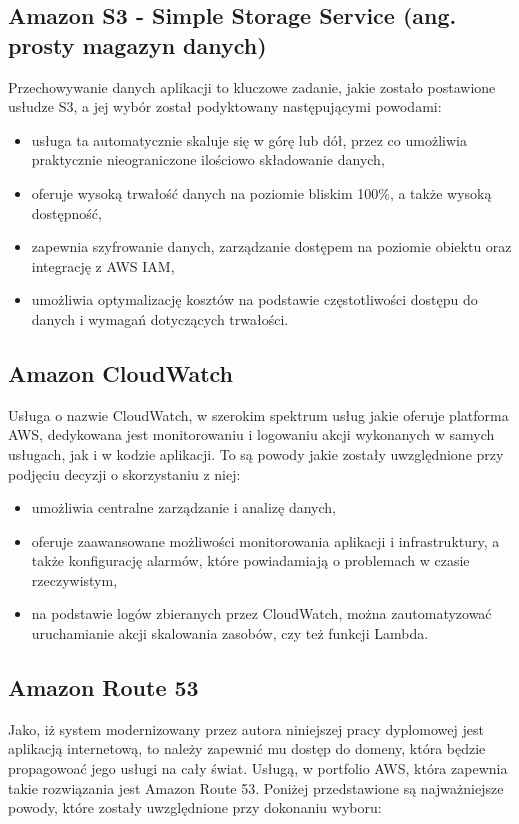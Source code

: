 \documentclass[12pt,oneside]{book}
\begin{document}
    \subsection{Amazon S3 - Simple Storage Service (ang. prosty magazyn danych)}
    Przechowywanie danych aplikacji to kluczowe zadanie, jakie zostało postawione usłudze S3, a jej wybór został podyktowany następującymi powodami:

    \begin{itemize}
        \item usługa ta automatycznie skaluje się w górę lub dół, przez co umożliwia praktycznie nieograniczone ilościowo składowanie danych,
        \item oferuje wysoką trwałość danych na poziomie bliskim 100\%, a także wysoką dostępność,
        \item zapewnia szyfrowanie danych, zarządzanie dostępem na poziomie obiektu oraz integrację z AWS IAM,
        \item umożliwia optymalizację kosztów na podstawie częstotliwości dostępu do danych i wymagań dotyczących trwałości. \cite{aws.s3}
    \end{itemize}

    \subsection{Amazon CloudWatch}
    Usługa o nazwie CloudWatch, w szerokim spektrum usług jakie oferuje platforma AWS, dedykowana jest monitorowaniu i logowaniu akcji wykonanych w samych usługach, jak i w kodzie aplikacji. To są powody jakie zostały uwzględnione przy podjęciu decyzji o skorzystaniu z niej:

    \begin{itemize}
        \item umożliwia centralne zarządzanie i analizę danych,
        \item oferuje zaawansowane możliwości monitorowania aplikacji i infrastruktury, a także konfigurację alarmów, które powiadamiają o problemach w czasie rzeczywistym,
        \item na podstawie logów zbieranych przez CloudWatch, można zautomatyzować uruchamianie akcji skalowania zasobów, czy też funkcji Lambda. \cite{aws.cloud.watch}
    \end{itemize}

    \subsection{Amazon Route 53}
    Jako, iż system modernizowany przez autora niniejszej pracy dyplomowej jest aplikacją internetową, to należy zapewnić mu dostęp do domeny, która będzie propagowoać jego usługi na cały świat. Usługą, w portfolio AWS, która zapewnia takie rozwiązania jest Amazon Route 53. Poniżej przedstawione są najważniejsze powody, które zostały uwzględnione przy dokonaniu wyboru:
\end{document}
